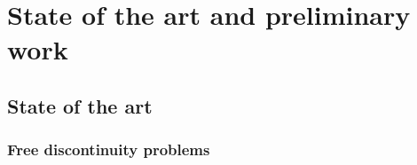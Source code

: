 \documentclass[enabledeprecatedfontcommands,cleardoublepage=empty,headsepline,twoside,11pt,DIV=15,BCOR=12mm,final]{scrartcl}
\begin{document}



\section{State of the art and preliminary work}
\label{sec:state-prelim}

\subsection{State of the art}
\label{sec:state} 

\subsubsection{Free discontinuity problems}
\end{document}
